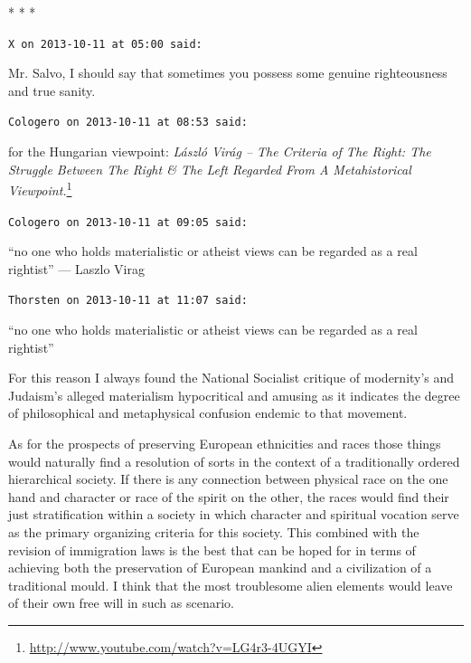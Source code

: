 
\begin{center}* * *\end{center}

\begin{footnotesize}
\begin{sffamily}
\texttt{X on 2013-10-11 at 05:00 said:}

Mr. Salvo, I should say that sometimes you possess some genuine righteousness and true sanity.

\hfill

\texttt{Cologero on 2013-10-11 at 08:53 said:}

for the Hungarian viewpoint:
\textit{László Virág -- The Criteria of The Right: The Struggle Between The Right \& The Left Regarded From A Metahistorical Viewpoint.}\footnote{\url{http://www.youtube.com/watch?v=LG4r3-4UGYI}}

\hfill

\texttt{Cologero on 2013-10-11 at 09:05 said:}

``no one who holds materialistic or atheist views can be regarded as a real rightist'' --- Laszlo Virag

\hfill

\texttt{Thorsten on 2013-10-11 at 11:07 said:}

``no one who holds materialistic or atheist views can be regarded as a real rightist''

For this reason I always found the National Socialist critique of modernity's and Judaism's alleged materialism hypocritical and amusing as it indicates the degree of philosophical and metaphysical confusion endemic to that movement.

As for the prospects of preserving European ethnicities and races those things would naturally find a resolution of sorts in the context of a traditionally ordered hierarchical society. If there is any connection between physical race on the one hand and character or race of the spirit on the other, the races would find their just stratification within a society in which character and spiritual vocation serve as the primary organizing criteria for this society. This combined with the revision of immigration laws is the best that can be hoped for in terms of achieving both the preservation of European mankind and a civilization of a traditional mould. I think that the most troublesome alien elements would leave of their own free will in such as scenario.


\end{sffamily}
\end{footnotesize}

